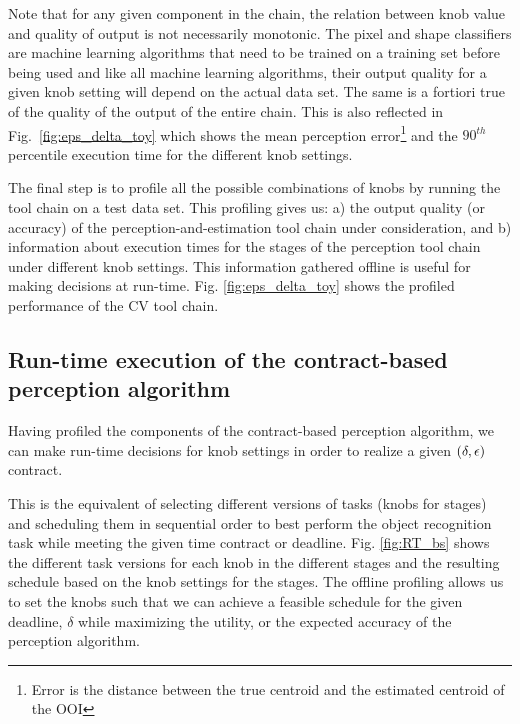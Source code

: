 Note that for any given component in the chain, the relation between knob value and quality of output is not necessarily monotonic. The pixel and shape classifiers are machine learning algorithms that need to be trained on a training set before being used and like all machine learning algorithms, their output quality for a given knob setting will depend on the actual data set.
The same is a fortiori true of the quality of the output of the entire chain. This is also reflected in Fig.~\ref{fig:eps_delta_toy} which shows the mean perception error\footnote{Error is the distance between the true centroid and the estimated centroid of the OOI} and the $90^{th}$ percentile execution time for the different knob settings. 

The final step is to profile all the possible combinations of knobs by running the tool chain on a test data set.
This profiling gives us: a) the output quality (or accuracy) of the perception-and-estimation tool chain under consideration, and b) information about execution times for the stages of the perception tool chain under different knob settings. 
This information gathered offline is useful for making decisions at run-time. 
Fig. \ref{fig:eps_delta_toy} shows the profiled performance of the CV tool chain.


\subsection{Run-time execution of the contract-based perception algorithm}

Having profiled the components of the contract-based perception algorithm, we can make run-time decisions for knob settings in order to realize a given $(\delta,\epsilon)$ contract. 

This is the equivalent of selecting different versions of tasks (knobs for stages) and scheduling them in sequential order to best perform the object recognition task while meeting the given time contract or deadline. Fig. \ref{fig:RT_bs} shows the different task versions for each knob in the different stages and the resulting schedule based on the knob settings for the stages. The offline profiling allows us to set the knobs such that we can achieve a feasible schedule for the given deadline, $\delta$ while maximizing the utility, or the expected accuracy of the perception algorithm. 

